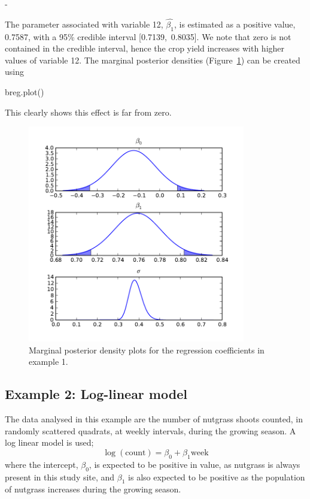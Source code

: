-\documentclass[article]{jss}
\begin{document}
The parameter associated with variable 12, $\hat{\beta_{1}}$, is
estimated as a positive value, 0.7587, with a 95\% credible interval
{[}0.7139,~0.8035{]}. We note that zero is not contained in the
credible interval, hence the crop yield increases with higher values
of variable 12. The marginal posterior densities
(Figure~\ref{Flo:mpdreg}) can be created using
\begin{Code}
breg.plot()
\end{Code}

This clearly shows this effect is far from zero. %

\begin{figure}[t!]
  \begin{center}
    \includegraphics[width=9.5cm]{mpdreg.pdf}
  \end{center}
\caption{Marginal posterior density plots for the regression coefficients in example 1.}
\label{Flo:mpdreg}
\end{figure}



\subsection{Example 2: Log-linear model}
\label{sub:Example-2:-Log-linear}

The data analysed in this example are the number of nutgrass shoots
counted, in randomly scattered quadrats, at weekly intervals, during
the growing season. A log linear model is used; \begin{equation}
  \log(\mbox{count})=\beta_{0}+\beta_{1}\mbox{week}\end{equation}
where the intercept, $\beta_{0}$, is expected to be positive in value,
as nutgrass is always present in this study site, and $\beta_{1}$ is
also expected to be positive as the population of nutgrass increases
during the growing season.
\end{document}
